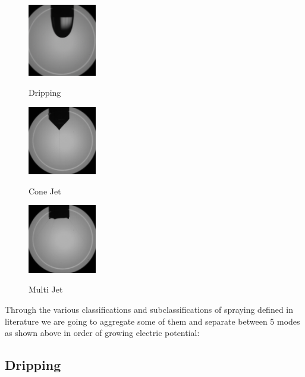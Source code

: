 \begin{multicols}{3}

  \begin{figure}[H]
      \center
      \includegraphics[width=3cm]{Figuras/drippingexample.png}
      \label{fig:dripping_camera_example}
      \caption{Dripping}
  \end{figure}


  \begin{figure}[H]
      \center
      \includegraphics[width=3cm]{Figuras/conejetexample.png}
      \label{fig:cone_camera_jet_example}
      \caption{Cone Jet}
  \end{figure}


  \begin{figure}[H]
      \center
      \includegraphics[width=3cm]{Figuras/multijetexample.png}
      \label{fig:multi_camera_jet_example}
      \caption{Multi Jet}
  \end{figure}

\end{multicols}


Through the various classifications and subclassifications of spraying defined in literature we are going to aggregate some of them and separate between 5 modes as shown above in order of growing electric potential:

\subsection{Dripping}
\label{subsec:dripping}

